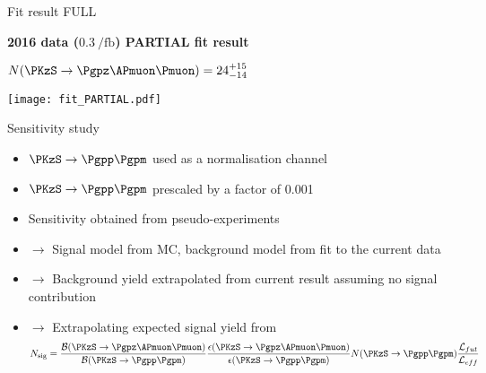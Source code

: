 \documentclass[9pt,hyperref={unicode},utf8]{beamer}
\newcommand{\KsPizMuMu}{\ensuremath{\PKzS\rightarrow \Pgpz\APmuon\Pmuon} }
\newcommand{\KsPipPim}{\ensuremath{\PKzS\rightarrow\Pgpp\Pgpm} }
\begin{document}
\begin{frame}{Fit result FULL}
  \begin{center}
     \textbf{2016 data ($\SI{0.3}{\per\femto\barn}$) PARTIAL fit result}\\ 
     
    \vspace{0.2cm}
    
    \textbf{$N(\KsPizMuMu)=24^{+15}_{-14}$}\\
    
    \vspace{0.2cm}
     
      \texttt{[image: fit\_PARTIAL.pdf]}\\
    
  \end{center}
\end{frame}

\begin{frame}{Sensitivity study}
 \begin{itemize}
   \setlength\itemsep{0.7em}
    \item \KsPipPim used as a normalisation channel
    \item \KsPipPim prescaled by a factor of 0.001
    \item Sensitivity obtained from pseudo-experiments
    \item[]$\rightarrow$ Signal model from MC, background model from fit to the current data
    \item[]$\rightarrow$ Background yield extrapolated from current result assuming no signal contribution
    \item[]$\rightarrow$ Extrapolating expected signal yield from
 \begin{equation*}
  N_{\rm sig} = \frac{{\cal B}(\KsPizMuMu)}{{\cal B}(\KsPipPim)}\frac{\epsilon(\KsPizMuMu)}{\epsilon(\KsPipPim)} N(\KsPipPim)\frac{{\cal L}_{fut}}{{\cal L}_{eff}}
 \end{equation*} 
 \end{itemize}
\end{frame}
\end{document}
